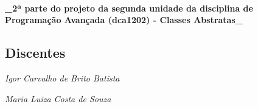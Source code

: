 \paragraph*{\+\_\+2ª parte do projeto da segunda unidade da disciplina de Programação Avançada (dca1202) -\/ Classes Abstratas\+\_\+}

\subsection*{Discentes}


\begin{DoxyItemize}
\item {\itshape Igor Carvalho de Brito Batista}
\item {\itshape Maria Luiza Costa de Souza} 
\end{DoxyItemize}